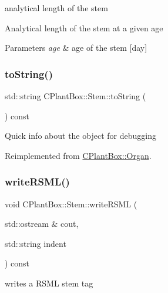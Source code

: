 analytical length of the stem 

Analytical length of the stem at a given age


\begin{DoxyParams}{Parameters}
{\em age} & age of the stem \mbox{[}day\mbox{]} \\
\hline
\end{DoxyParams}
\mbox{\label{classCPlantBox_1_1Stem_a08ed9dc10ef3ea13c90bc326e6cc989b}} 
\subsubsection{\texorpdfstring{to\+String()}{toString()}}
{\footnotesize\ttfamily std\+::string C\+Plant\+Box\+::\+Stem\+::to\+String (\begin{DoxyParamCaption}{ }\end{DoxyParamCaption}) const\hspace{0.3cm}{\ttfamily [virtual]}}

Quick info about the object for debugging 

Reimplemented from \hyperlink{classCPlantBox_1_1Organ_a9f823aebd19519096e899e65604f239f}{C\+Plant\+Box\+::\+Organ}.

\mbox{\label{classCPlantBox_1_1Stem_ae4087e7edf3b51619d6e8fd03a3c9ec8}} 
\subsubsection{\texorpdfstring{write\+R\+S\+M\+L()}{writeRSML()}}
{\footnotesize\ttfamily void C\+Plant\+Box\+::\+Stem\+::write\+R\+S\+ML (\begin{DoxyParamCaption}\item[{std\+::ostream \&}]{cout,  }\item[{std\+::string}]{indent }\end{DoxyParamCaption}) const\hspace{0.3cm}{\ttfamily [virtual]}}



writes a R\+S\+ML stem tag 

